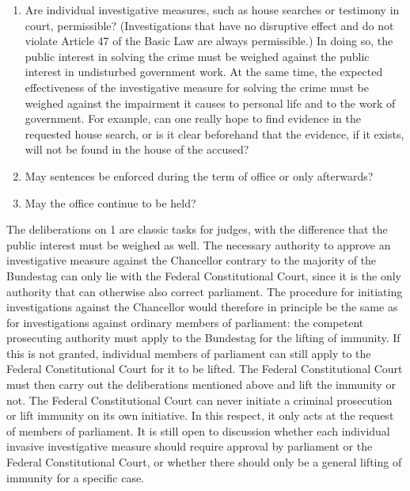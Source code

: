 
\begin{enumerate}
    \item Are individual investigative measures, such as house searches or testimony in court, permissible?
    (Investigations that have no disruptive effect and do not violate Article 47 of the Basic Law are always permissible.)
    In doing so, the public interest in solving the crime must be weighed against the public interest in undisturbed government work.
    At the same time, the expected effectiveness of the investigative measure for solving the crime must be weighed against the impairment it causes to personal life and to the work of government.
    For example, can one really hope to find evidence in the requested house search, or is it clear beforehand that the evidence, if it exists, will not be found in the house of the accused?
    \item May sentences be enforced during the term of office or only afterwards?
    \item May the office continue to be held?
\end{enumerate}

The deliberations on 1 are classic tasks for judges, with the difference that the public interest must be weighed as well.
The necessary authority to approve an investigative measure against the Chancellor contrary to the majority of the Bundestag can only lie with the Federal Constitutional Court, since it is the only authority that can otherwise also correct parliament.
The procedure for initiating investigations against the Chancellor would therefore in principle be the same as for investigations against ordinary members of parliament: the competent prosecuting authority must apply to the Bundestag for the lifting of immunity.
If this is not granted, individual members of parliament can still apply to the Federal Constitutional Court for it to be lifted.
The Federal Constitutional Court must then carry out the deliberations mentioned above and lift the immunity or not.
The Federal Constitutional Court can never initiate a criminal prosecution or lift immunity on its own initiative.
In this respect, it only acts at the request of members of parliament.
It is still open to discussion whether each individual invasive investigative measure should require approval by parliament or the Federal Constitutional Court, or whether there should only be a general lifting of immunity for a specific case.

